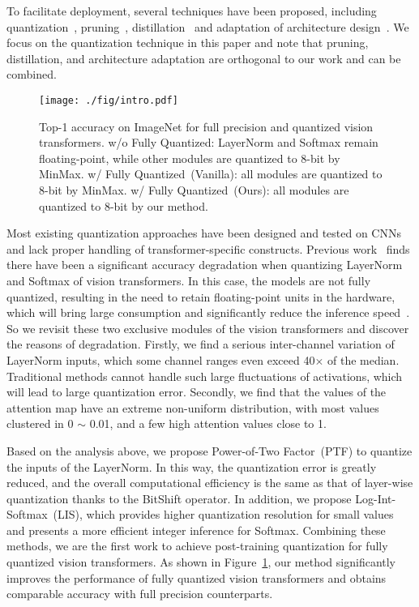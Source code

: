 \documentclass{article}
\begin{document}
To facilitate deployment, several techniques have been proposed, including quantization~\cite{zhou2016dorefa,nagel2020up,shen2020q,liu2021post}, pruning~\cite{han2015deep}, distillation~\cite{jiao2019tinybert} and adaptation of architecture design~\cite{graham2021levit}. We focus on the quantization technique in this paper and note that pruning, distillation, and architecture adaptation are orthogonal to our work and can be combined.

\begin{figure}[t]

\centering
\texttt{[image: ./fig/intro.pdf]}
\vskip -0.1in
\caption{Top-1 accuracy on ImageNet for full precision and quantized vision transformers.
w/o Fully Quantized: LayerNorm and Softmax remain floating-point, while other modules are quantized to 8-bit by MinMax.
w/ Fully Quantized~(Vanilla): all modules are quantized to 8-bit by MinMax.
w/ Fully Quantized~(Ours): all modules are quantized to 8-bit by our method. 
}
\label{fig:intro}
\vskip -0.1in
\end{figure}


Most existing quantization approaches have been designed and tested on CNNs and lack proper handling of transformer-specific constructs. Previous work~\cite{liu2021post} finds there have been a significant accuracy degradation when quantizing LayerNorm and Softmax of vision transformers. In this case, the models are not fully quantized, resulting in the need to retain floating-point units in the hardware, which will bring large consumption and significantly reduce the inference speed~\cite{8716697}.
So we revisit these two exclusive modules of the vision transformers and discover the reasons of degradation. Firstly, we find a serious inter-channel variation of LayerNorm inputs, which some channel ranges even exceed 40$\times$ of the median. Traditional methods cannot handle such large fluctuations of activations, which will lead to large quantization error.
Secondly, we find that the values of the attention map have an extreme non-uniform distribution, with most values clustered in 0 $\sim$ 0.01, and a few high attention values close to 1.

Based on the analysis above, we propose Power-of-Two Factor~(PTF) to quantize the inputs of the LayerNorm. In this way, the quantization error is greatly reduced, and the overall computational efficiency is the same as that of layer-wise quantization thanks to the BitShift operator.
In addition, we propose Log-Int-Softmax~(LIS), which provides higher quantization resolution for small values and presents a more efficient integer inference for Softmax.
Combining these methods, we are the first work to achieve post-training quantization for fully quantized vision transformers. As shown in Figure~\ref{fig:intro}, our method significantly improves the performance of fully quantized vision transformers and obtains comparable accuracy with full precision counterparts.
\end{document}
